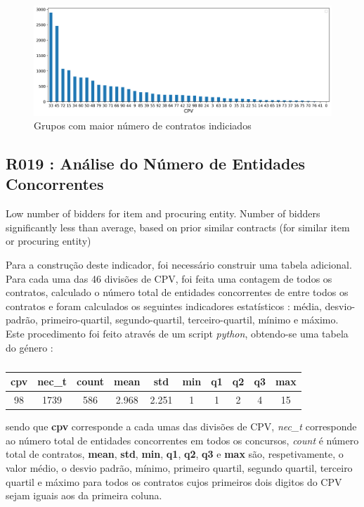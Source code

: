 \begin{figure}[H]
	\centering
	\includegraphics[width=\textwidth]{imagens/r018.png}
	\caption{Grupos com maior número de contratos indiciados}
	\label{}
\end{figure}

\subsection{R019 : Análise do Número de Entidades Concorrentes}

\Lemma{}
	{
	Low number of bidders for item and procuring entity. Number of bidders significantly less than average, based on prior similar contracts (for similar item or procuring entity) 
	}


Para a construção deste indicador, foi necessário construir uma tabela adicional. Para cada uma das 46 divisões de CPV, foi feita uma contagem de todos os contratos, calculado o número total de entidades concorrentes de entre todos os contratos e foram calculados os seguintes indicadores estatísticos : média, desvio-padrão, primeiro-quartil, segundo-quartil, terceiro-quartil, mínimo e máximo. Este procedimento foi feito através de um script \textit{python}, obtendo-se uma tabela do género : 

\begin{table}[H]
	\centering
	\begin{tabular}{|c|c|c|c|c|c|c|c|c|c|}
		\hline
		\textbf{cpv} & \textbf{nec\_t} & \textbf{count} & \textbf{mean} & \textbf{std} & \textbf{min} & \textbf{q1} & \textbf{q2} & \textbf{q3} & \textbf{max} \\ \hline
		98           & 1739            & 586            & 2.968         & 2.251        & 1            & 1           & 2           & 4           & 15           \\ \hline
	\end{tabular}
	\caption{}
\end{table}

sendo que \textbf{cpv} corresponde a cada umas das divisões de CPV, \textit{nec\_t} corresponde ao número total de entidades concorrentes em todos os concursos, \textit{count} é número total de contratos, \textbf{mean}, \textbf{std}, \textbf{min}, \textbf{q1}, \textbf{q2}, \textbf{q3} e \textbf{max} são, respetivamente, o valor médio, o desvio padrão, mínimo, primeiro quartil, segundo quartil, terceiro quartil e máximo para todos os contratos cujos primeiros dois digitos do CPV sejam iguais aos da primeira coluna. 

